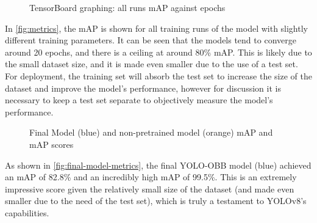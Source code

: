 \begin{figure}[H]
  \centering
   
  \caption{TensorBoard graphing: all runs mAP against epochs}
  \label{fig:metrics}
\end{figure}
  
In \autoref{fig:metrics}, the mAP is shown for all training runs of the model with slightly different training parameters. It can be seen that the models tend to converge around 20 epochs, and there is a ceiling at around 80\% mAP. This is likely due to the small dataset size, and it is made even smaller due to the use of a test set. For deployment, the training set will absorb the test set to increase the size of the dataset and improve the model's performance, however for discussion it is necessary to keep a test set separate to objectively measure the model's performance.


\begin{figure}[H]
  \centering
  \begin{minipage}[t]{0.8\textwidth}
    \centering
    
  \end{minipage}
  \par\medskip
  \begin{minipage}[t]{0.8\textwidth}
    \centering
    
  \end{minipage}
  \caption{Final Model (blue) and non-pretrained model (orange) mAP and mAP scores}
  \label{fig:final-model-metrics}
\end{figure}

As shown in \autoref{fig:final-model-metrics}, the final YOLO-OBB model (blue) achieved an mAP of 82.8\% and an incredibly high mAP of 99.5\%. This is an extremely impressive score given the relatively small size of the dataset (and made even smaller due to the need of the test set), which is truly a testament to YOLOv8's capabilities.

